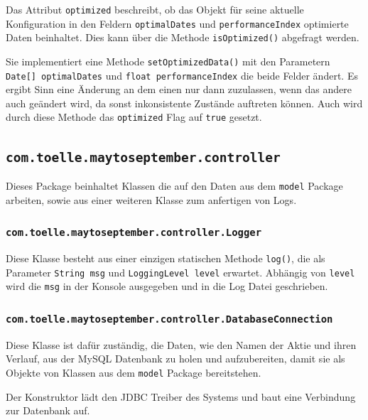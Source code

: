 \documentclass[12pt, a4paper, titlepage]{report}
\begin{document}
        		Das Attribut \texttt{optimized} beschreibt, ob das Objekt für
        		seine aktuelle Konfiguration in den Feldern \texttt{optimalDates}
        		und \texttt{performanceIndex} optimierte Daten beinhaltet. Dies
        		kann über die Methode \texttt{isOptimized()} abgefragt werden.
        		
        		Sie implementiert eine Methode \texttt{setOptimizedData()} mit den
        		Parametern \texttt{Date[] optimalDates} und \texttt{float performanceIndex}
        		die beide Felder ändert. Es ergibt Sinn eine Änderung an dem einen
        		nur dann zuzulassen, wenn das andere auch geändert wird, da sonst
        		inkonsistente Zustände auftreten können. Auch wird durch diese Methode
        		das \texttt{optimized} Flag auf \texttt{true} gesetzt.        		
        	
        	\subsection{\texttt{com.toelle.maytoseptember.controller}}
        		Dieses Package beinhaltet Klassen die auf den Daten aus dem
        		\texttt{model} Package arbeiten, sowie aus
        		einer weiteren Klasse zum anfertigen von Logs.
        		
        		\subsubsection{\texttt{com.toelle.maytoseptember.controller.Logger}}
        		Diese Klasse besteht aus einer einzigen statischen Methode
        		\texttt{log()}, die als Parameter \texttt{String msg} und
        		\texttt{LoggingLevel level} erwartet. Abhängig von \texttt{level} wird
        		die \texttt{msg} in der Konsole ausgegeben und in die Log Datei
        		geschrieben.
        		
        		\subsubsection{\texttt{com.toelle.maytoseptember.controller.DatabaseConnection}}
        		Diese Klasse ist dafür zuständig, die Daten, wie den Namen der Aktie und ihren
        		Verlauf, aus der MySQL Datenbank zu holen und aufzubereiten, damit sie als
        		Objekte von Klassen aus dem \texttt{model} Package bereitstehen.
        		
        		Der Konstruktor lädt den JDBC Treiber des Systems und baut eine Verbindung
        		zur Datenbank auf.
        		
\end{document}
